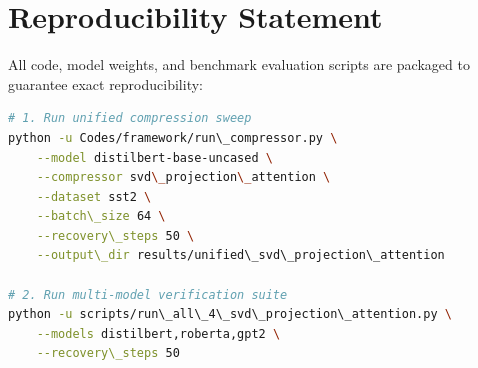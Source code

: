 \section{Reproducibility Statement}
All code, model weights, and benchmark evaluation scripts are packaged to guarantee exact reproducibility:
\begin{lstlisting}[language=bash]
# 1. Run unified compression sweep
python -u Codes/framework/run\_compressor.py \
    --model distilbert-base-uncased \
    --compressor svd\_projection\_attention \
    --dataset sst2 \
    --batch\_size 64 \
    --recovery\_steps 50 \
    --output\_dir results/unified\_svd\_projection\_attention

# 2. Run multi-model verification suite
python -u scripts/run\_all\_4\_svd\_projection\_attention.py \
    --models distilbert,roberta,gpt2 \
    --recovery\_steps 50
\end{lstlisting}

